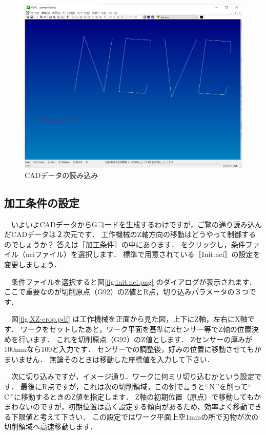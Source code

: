 \begin{figure}[H]
\centering
\includegraphics[scale=0.55]{No2/fig/ReadJWW.png}
\caption{CADデータの読み込み}
\label{fig:ReadJWW.png}
\end{figure}

\subsection{加工条件の設定}
\label{sec:init.nci}

　いよいよCADデータからGコードを生成するわけですが，ご覧の通り読み込んだCADデータは２次元です．
工作機械のZ軸方向の移動はどうやって制御するのでしょうか？
答えは［加工条件］の中にあります．
 をクリックし，条件ファイル（nciファイル）を選択します．
標準で用意されている［Init.nci］の設定を変更しましょう．

　条件ファイルを選択すると図\ref{fig:init.nci.png} のダイアログが表示されます．
ここで重要なのが切削原点（G92）のZ値とR点，切り込みパラメータの３つです．

　図\ref{fig:XZ-crop.pdf} は工作機械を正面から見た図，上下にZ軸，左右にX軸です．
ワークをセットしたあと，ワーク平面を基準にZセンサー等でZ軸の位置決めを行います．
これを切削原点（G92）のZ値とします．
Zセンサーの厚みが100mmなら100と入力です．
センサーでの調整後，好みの位置に移動させてもかまいません．
無論そのときは移動した座標値を入力して下さい．

　次に切り込みですが，イメージ通り．ワークに何ミリ切り込むかという設定です．
最後にR点ですが，これは次の切削領域，この例で言うと``\,N\,''を削って``\,C\,''に移動するときのZ値を指定します．
Z軸の初期位置（原点）で移動してもかまわないのですが，初期位置は高く設定する傾向があるため，効率よく移動できる下限値と考えて下さい．
この設定ではワーク平面上空1mmの所で刃物が次の切削領域へ高速移動します．

